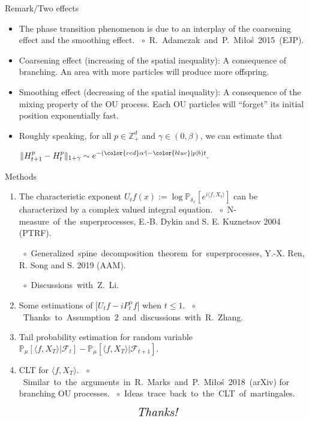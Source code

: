 \documentclass[xcolor=dvipsnames]{beamer}
\begin{document}
\begin{frame}{Remark/Two effects}
\begin{itemize}
\item
	The phase transition phenomenon is due to an interplay of the {\color{red} coarsening effect} and the {\color{blue}smoothing effect}.
  \mbox{ $\circ$ R. Adamczak and P. Mi{\l}o{\'s} 2015 (EJP).}
\item
	{\color{red}Coarsening effect} (increasing of the spatial inequality): 
  A consequence of branching. 
  An area with more particles will produce more offspring.
\item
	{\color{blue}Smoothing effect} (decreasing of the spatial inequality):  
	A consequence of the mixing property of the OU process. 
  Each OU particles will ``forget'' its initial position exponentially fast.   
\item
  Roughly speaking, for all $p \in \mathbb Z_+^d$ and $\gamma \in (0,\beta)$, we can estimate that
  
  \centerline{ \( \displaystyle
    \|H_{t+1}^p - H_t^p\|_{1+\gamma} 
    \sim e^{- ( {\color{red}\alpha\tilde\gamma} - {\color{blue}|p|b})t}.
    \)} 
\end{itemize}
\end{frame}
\begin{frame} {Methods}
  \begin{enumerate}
    \item
      The characteristic exponent $U_t f(x):= \log \mathbb P_{\delta_x}[e^{i \langle f, X_t \rangle}]$ can be characterized by a complex valued integral equation.
      \mbox{ $\circ$ N-measure of the superprocesses}, E.-B. Dykin and S. E. Kuznetsov 2004 (PTRF).

\mbox{ $\circ$ Generalized spine decomposition theorem for superprocesses,} Y.-X. Ren, R. Song and S. 2019 (AAM). 

\mbox{ $\circ$ Discussions with Z. Li.}
\item Some estimations of $|U_tf - iP_t^\alpha f|$ when $t\leq 1$.
  \mbox{ $\circ$ Thanks to Assumption 2 and discussions with R. Zhang.}
\item Tail probability estimation for random variable 
  \(\mathbb P_\mu [\langle f, X_{T}\rangle | \mathscr F_t] - \mathbb P_\mu [\langle f, X_{T}\rangle | \mathscr F_{t+1}].\) 
\item
  CLT for $\langle f,X_T\rangle$.
  \mbox{ $\circ$ Similar to the arguments in R. Marks and P. Mi{\l}o{\'s} 2018 (arXiv)} for branching OU processes. 
  \mbox{ $\circ$ Ideas trace back to the CLT of martingales.}
    \end{enumerate}
    
\end{frame}
\begin{frame}
  \[ \text{ \it \Large Thanks!}\]
\end{frame}
\end{document}
